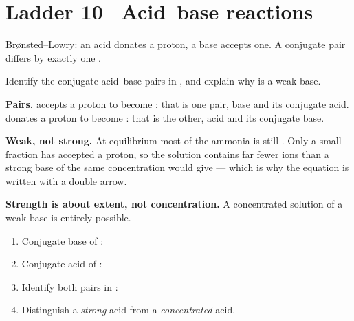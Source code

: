 \documentclass{apchem-worksheet}
\begin{document}
\section*{\sffamily Ladder 10 \textbullet\ Acid--base reactions}

Br\o{}nsted--Lowry: an acid donates a proton, a base accepts one. A
conjugate pair differs by exactly one .

\begin{workedexample}
Identify the conjugate acid--base pairs in
, and explain why  is a weak base.

\textbf{Pairs.}  accepts a proton to become : that is one
pair, base and its conjugate acid.  donates a proton to become
: that is the other, acid and its conjugate base.

\textbf{Weak, not strong.} At equilibrium most of the ammonia is still
. Only a small fraction has accepted a proton, so the solution
contains far fewer  ions than a strong base of the same
concentration would give --- which is why the equation is written with a
double arrow.

\textbf{Strength is about extent, not concentration.} A concentrated
solution of a weak base is entirely possible.
\end{workedexample}

\begin{yourturn}
\begin{enumerate}[leftmargin=*,itemsep=0.5em]
  \item Conjugate base of : \workspace[1.4cm]
  \item Conjugate acid of : \workspace[1.4cm]
  \item Identify both pairs in :
        \workspace[1.6cm]
  \item Distinguish a \emph{strong} acid from a \emph{concentrated} acid.
        \workspace[1.8cm]
\end{enumerate}
\end{yourturn}
\end{document}
